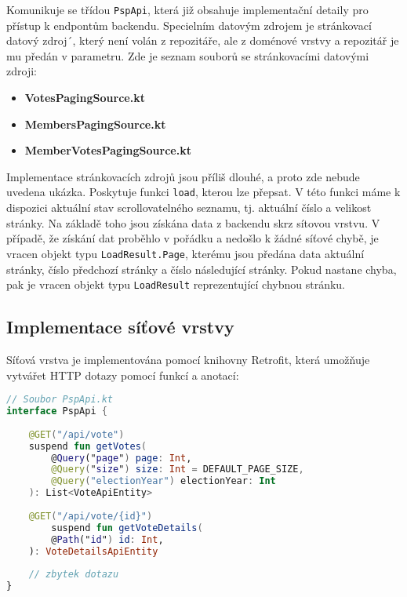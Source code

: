 \noindent Komunikuje se třídou \lstinline|PspApi|, která již obsahuje implementační detaily pro přístup k endpontům backendu. Specielním datovým zdrojem je stránkovací datový zdroj´, který není volán z repozitáře, ale z doménové vrstvy a repozitář je mu předán v parametru. Zde je seznam souborů se stránkovacími datovými zdroji:

\begin{itemize}
	\item \textbf{VotesPagingSource.kt}
	\item \textbf{MembersPagingSource.kt}
	\item \textbf{MemberVotesPagingSource.kt}
\end{itemize}

\noindent Implementace stránkovacích zdrojů jsou příliš dlouhé, a proto zde nebude uvedena ukázka. Poskytuje funkci \lstinline|load|, kterou lze přepsat. V této funkci máme k dispozici aktuální stav scrollovatelného seznamu, tj. aktuální číslo a velikost stránky. Na základě toho jsou získána data z backendu skrz sítovou vrstvu. V případě, že získání dat proběhlo v pořádku a nedošlo k žádné síťové chybě, je vracen objekt typu \lstinline|LoadResult.Page|, kterému jsou předána data aktuální stránky, číslo předchozí stránky a číslo následující stránky. Pokud nastane chyba, pak je vracen objekt typu \lstinline|LoadResult| reprezentující chybnou stránku.

\subsection{Implementace síťové vrstvy}
\label{sec:impl-network}

\noindent Síťová vrstva je implementována pomocí knihovny Retrofit, která umožňuje vytvářet HTTP dotazy pomocí funkcí a anotací:

\begin{lstlisting}[caption={Ukázka použití knihovny Retrofit pro získání seznamu hlasování z backendu}, label={lst:retrofit-votes}, tabsize=2, language=Kotlin]
// Soubor PspApi.kt
interface PspApi {
	
	@GET("/api/vote")
	suspend fun getVotes(
		@Query("page") page: Int,
		@Query("size") size: Int = DEFAULT_PAGE_SIZE,
		@Query("electionYear") electionYear: Int
	): List<VoteApiEntity>
	
	@GET("/api/vote/{id}")
		suspend fun getVoteDetails(
		@Path("id") id: Int,
	): VoteDetailsApiEntity
	
	// zbytek dotazu
}
\end{lstlisting}

